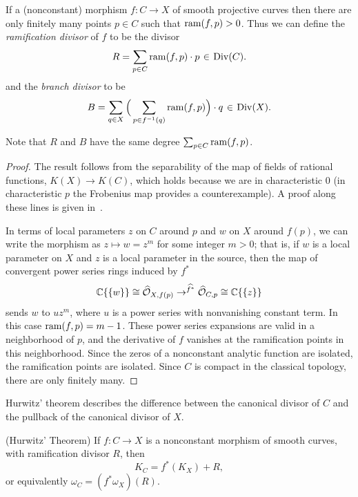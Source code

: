 \begin{proposition}
If a (nonconstant) morphism $f : C \to X$ of smooth projective curves then there are only finitely many
points $p\in C$ such that $\operatorname{ram}(f,p)>0$.
Thus we can define the \emph{ramification divisor} of $f$ to be the divisor
 $$
 R = \sum_{p \in C} \ram(f,p)\cdot p \; \in \;  \Div(C).
 $$
 and the \emph{branch divisor} to be
 $$
 B = \sum_{q \in X} \Big(\sum_{p \in f^{-1}(q)} \ram(f,p) \Big)\cdot q \; \in \; \Div(X).
 $$
\end{proposition}

Note that $R$ and $B$ have the same degree $\sum_{p \in C} \operatorname{ram}(f,p)$.

\begin{proof}
The result follows from the separability of the map of fields of rational functions, $K(X) \to K(C)$, which holds because we
are in characteristic 0 (in characteristic $p$ the Frobenius map provides a counterexample). A proof along these lines
is given in~\cite[Section IV.2]{Hartshorne1977}.

In terms of local parameters $z$ on $C$ around $p$ and $w$ on $X$ around $f(p)$, we can write the morphism as $z \mapsto w = z^m$ for some integer $m > 0$; that is,
if $w$ is a local parameter on $X$ and $z$ is a local parameter in the source, then
the map of convergent power series rings induced by $f^*$
$$
 {\mathbb C}\{\{w\}\} \cong \widehat{{\mathcal O}}_{X,f(p)} \to^{\widehat {f^*}}\widehat{{\mathcal O}}_{C,p}\cong  {\mathbb C}\{\{z\}\} 
$$
sends $w$ to $uz^m$, where $u$ is a power series with nonvanishing constant term.
In this case $\operatorname{ram}(f,p) = m-1$. These power series expansions are valid in a neighborhood
of $p$, and the derivative of $f$ vanishes at the ramification points in this neighborhood. Since
the zeros of a nonconstant analytic function are isolated, the ramification points are isolated. 
Since $C$ is compact in the classical topology, there are only finitely many.
\end{proof}

 Hurwitz' theorem describes the difference between the canonical divisor of $C$ and the pullback of the canonical divisor of $X$.
\begin{theorem}(Hurwitz' Theorem) \cite[Proposition IV.2.3]{H} \label{Hurwitz}
If $f:C\to X$ is a nonconstant morphism of smooth curves, with ramification divisor $R$, then 
$$
K_C = f^{*}(K_{X})+R,$$
or equivalently
$
\omega_{C} = (f^{*}\omega_{X})(R).
$
\end{theorem}
 
